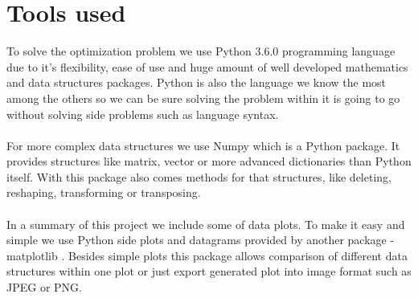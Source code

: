 \documentclass[conference]{IEEEtran}
\begin{document}
\section{Tools used}
To solve the optimization problem we use Python 3.6.0 \cite{python} programming language due to it's flexibility, ease of use and huge amount of well developed mathematics and data structures packages. Python is also the language we know the most among the others so we can be sure solving the problem within it is going to go without solving side problems such as language syntax.
\\ \\
For more complex data structures we use Numpy \cite{numpy} which is a Python package. It provides structures like matrix, vector or more advanced dictionaries than Python itself. With this package also comes methods for that structures, like deleting, reshaping, transforming or transposing.
\\ \\
In a summary of this project we include some of data plots. To make it easy and simple we use Python side plots and datagrams provided by another package - matplotlib \cite{matplotlib}. Besides simple plots this package allows comparison of different data structures within one plot or just export generated plot into image format such as JPEG or PNG.
\\
\end{document}
